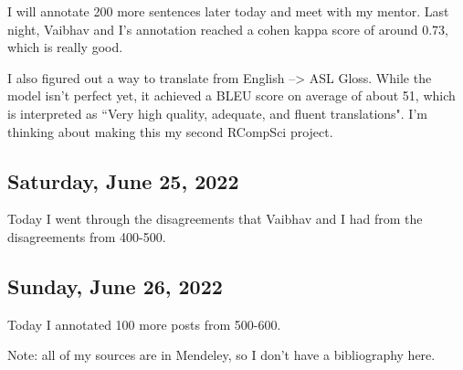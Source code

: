 \documentclass[11pt,letterpaper]{article}
\begin{document}
I will annotate 200 more sentences later today and meet with my mentor. Last night, Vaibhav and I's annotation reached a cohen kappa score of around 0.73, which is really good.


I also figured out a way to translate from English --> ASL Gloss. While the model isn't perfect yet, it achieved a BLEU score on average of about 51, which is interpreted as ``Very high quality, adequate, and fluent translations". I'm thinking about making this my second RCompSci project.

\subsection{Saturday, June 25, 2022}
Today I went through the disagreements that Vaibhav and I had from the disagreements from 400-500. 

\subsection{Sunday, June 26, 2022}
Today I annotated 100 more posts from 500-600.

\newpage
Note: all of my sources are in Mendeley, so I don't have a bibliography here.
\end{document}
